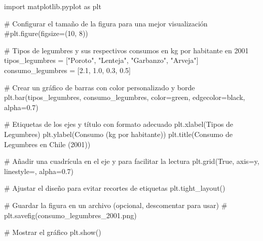 \documentclass[
  jou,
  floatsintext,
  longtable,
  a4paper,
  nolmodern,
  notxfonts,
  notimes,
  12pt,
  colorlinks=true,linkcolor=blue,citecolor=blue,urlcolor=blue]{apa7}
\newenvironment{Shaded}{\begin{snugshade}}{\end{snugshade}}
\newcommand{\CommentTok}[1]{\textcolor[rgb]{0.37,0.37,0.37}{#1}}
\newcommand{\FloatTok}[1]{\textcolor[rgb]{0.68,0.00,0.00}{#1}}
\newcommand{\ImportTok}[1]{\textcolor[rgb]{0.00,0.46,0.62}{#1}}
\newcommand{\NormalTok}[1]{\textcolor[rgb]{0.00,0.23,0.31}{#1}}
\newcommand{\OperatorTok}[1]{\textcolor[rgb]{0.37,0.37,0.37}{#1}}
\newcommand{\StringTok}[1]{\textcolor[rgb]{0.13,0.47,0.30}{#1}}
\newcommand{\VariableTok}[1]{\textcolor[rgb]{0.07,0.07,0.07}{#1}}
\begin{document}
\begin{Shaded}
\begin{Highlighting}[]
\ImportTok{import}\NormalTok{ matplotlib.pyplot }\ImportTok{as}\NormalTok{ plt}

\CommentTok{\# Configurar el tamaño de la figura para una mejor visualización}
\CommentTok{\#plt.figure(figsize=(10, 8))}

\CommentTok{\# Tipos de legumbres y sus respectivos consumos en kg por habitante en 2001}
\NormalTok{tipos\_legumbres }\OperatorTok{=}\NormalTok{ [}\StringTok{"Poroto"}\NormalTok{, }\StringTok{"Lenteja"}\NormalTok{, }\StringTok{"Garbanzo"}\NormalTok{, }\StringTok{"Arveja"}\NormalTok{]}
\NormalTok{consumo\_legumbres }\OperatorTok{=}\NormalTok{ [}\FloatTok{2.1}\NormalTok{, }\FloatTok{1.0}\NormalTok{, }\FloatTok{0.3}\NormalTok{, }\FloatTok{0.5}\NormalTok{]}

\CommentTok{\# Crear un gráfico de barras con color personalizado y borde}
\NormalTok{plt.bar(tipos\_legumbres, consumo\_legumbres, color}\OperatorTok{=}\StringTok{\textquotesingle{}green\textquotesingle{}}\NormalTok{, edgecolor}\OperatorTok{=}\StringTok{\textquotesingle{}black\textquotesingle{}}\NormalTok{, alpha}\OperatorTok{=}\FloatTok{0.7}\NormalTok{)}

\CommentTok{\# Etiquetas de los ejes y título con formato adecuado}
\NormalTok{plt.xlabel(}\StringTok{\textquotesingle{}Tipos de Legumbres\textquotesingle{}}\NormalTok{)}
\NormalTok{plt.ylabel(}\StringTok{\textquotesingle{}Consumo (kg por habitante)\textquotesingle{}}\NormalTok{)}
\NormalTok{plt.title(}\StringTok{\textquotesingle{}Consumo de Legumbres en Chile (2001)\textquotesingle{}}\NormalTok{)}

\CommentTok{\# Añadir una cuadrícula en el eje y para facilitar la lectura}
\NormalTok{plt.grid(}\VariableTok{True}\NormalTok{, axis}\OperatorTok{=}\StringTok{\textquotesingle{}y\textquotesingle{}}\NormalTok{, linestyle}\OperatorTok{=}\StringTok{\textquotesingle{}{-}{-}\textquotesingle{}}\NormalTok{, alpha}\OperatorTok{=}\FloatTok{0.7}\NormalTok{)}

\CommentTok{\# Ajustar el diseño para evitar recortes de etiquetas}
\NormalTok{plt.tight\_layout()}

\CommentTok{\# Guardar la figura en un archivo (opcional, descomentar para usar)}
\CommentTok{\# plt.savefig(\textquotesingle{}consumo\_legumbres\_2001.png\textquotesingle{})}

\CommentTok{\# Mostrar el gráfico}
\NormalTok{plt.show()}
\end{Highlighting}
\end{Shaded}
\end{document}
